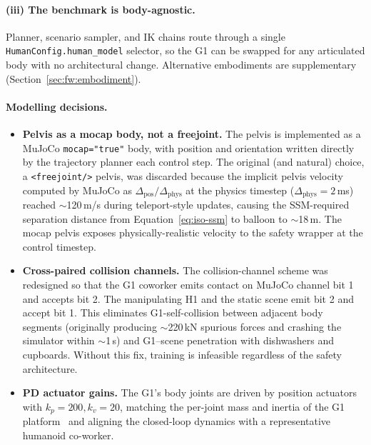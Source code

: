\documentclass[11pt,a4paper]{report}
\newcommand{\ssm}{SSM}
\begin{document}
\paragraph{(iii) The benchmark is body-agnostic.}
Planner, scenario sampler, and IK chains route through a single
\texttt{HumanConfig.human\_model} selector, so the G1 can be swapped
for any articulated body with no architectural change. Alternative
embodiments are supplementary
(Section~\ref{sec:fw:embodiment}).

\paragraph{Modelling decisions.}

\begin{itemize}[topsep=2pt,itemsep=2pt]
\item \textbf{Pelvis as a mocap body, not a freejoint.}
  The pelvis is implemented as a MuJoCo \texttt{mocap="true"} body,
  with position and orientation written directly by the trajectory
  planner each control step. The original (and natural) choice,
  a \texttt{<freejoint/>} pelvis, was discarded because the
  implicit pelvis velocity computed by MuJoCo as
  $\Delta_{\mathrm{pos}} / \Delta_{\mathrm{phys}}$ at the physics
  timestep ($\Delta_{\mathrm{phys}} = 2$\,ms) reached $\sim$120\,m/s
  during teleport-style updates, causing the \ssm{}-required
  separation distance from Equation~\ref{eq:iso-ssm} to balloon to
  $\sim$18\,m. The mocap pelvis exposes physically-realistic velocity
  to the safety wrapper at the control timestep.
\item \textbf{Cross-paired collision channels.}
  The collision-channel scheme was redesigned so that the G1
  coworker emits contact on MuJoCo channel bit 1 and accepts bit 2. The manipulating H1 and the static scene emit bit 2 and accept
  bit 1. This eliminates G1-self-collision between adjacent body
  segments (originally producing $\sim$220\,kN spurious forces and
  crashing the simulator within $\sim$1\,s) and G1--scene
  penetration with dishwashers and cupboards. Without this fix,
  training is infeasible regardless of the safety architecture.
\item \textbf{PD actuator gains.}
  The G1's body joints are driven by position actuators with
  $k_p = 200, k_v = 20$, matching the per-joint mass and inertia
  of the G1 platform~\cite{unitree_g1} and aligning the closed-loop
  dynamics with a representative humanoid co-worker.
\end{itemize}
\end{document}
